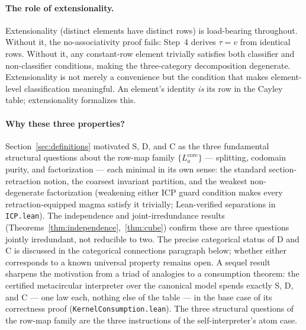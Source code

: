 \documentclass[sigconf,screen]{acmart}
\newcommand{\core}{\mathrm{core}}
\theoremstyle{remark}
\begin{document}
\paragraph{The role of extensionality.}
Extensionality (distinct elements have distinct rows) is load-bearing throughout. Without it, the no-associativity proof fails: Step~4 derives $\tau = v$ from identical rows. Without it, any constant-row element trivially satisfies both classifier and non-classifier conditions, making the three-category decomposition degenerate. Extensionality is not merely a convenience but the condition that makes element-level classification meaningful. An element's identity \emph{is} its row in the Cayley table; extensionality formalizes this.

\paragraph{Why these three properties?}
Section~\ref{sec:definitions} motivated S, D, and C as the three
fundamental structural questions about the row-map family
$\{L_a^{\core}\}$ --- splitting, codomain purity, and factorization ---
each minimal in its own sense: the standard section-retraction notion,
the coarsest invariant partition, and the weakest non-degenerate
factorization (weakening either ICP guard condition makes every
retraction-equipped magma satisfy it trivially; Lean-verified
separations in \texttt{ICP.lean}). The independence and
joint-irredundance results (Theorems~\ref{thm:independence},~\ref{thm:cube})
confirm these are three questions jointly irredundant, not reducible to
two. The precise categorical status of D and C is discussed in the
categorical connections paragraph below; whether either corresponds to
a known universal property remains open. A sequel result sharpens the
motivation from a triad of analogies to a consumption theorem: the
certified metacircular interpreter over the canonical model spends
exactly S, D, and C --- one law each, nothing else of the table --- in
the base case of its correctness proof
(\texttt{KernelConsumption.lean}). The three structural questions of
the row-map family are the three instructions of the self-interpreter's
atom case.
\end{document}
